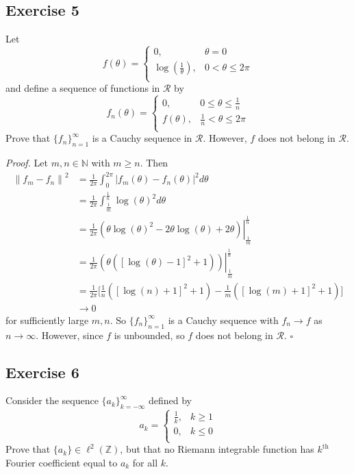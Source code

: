 \documentclass[12pt]{article}
\newenvironment{proof}{\textit{Proof.}}{\hfill$\square$}
\newcommand{\norm}[1]{\left\lVert#1\right\rVert}
\newcommand*\Eval[3]{\left.#1\right\rvert_{#2}^{#3}}
\newcommand{\bbn}{\mathbb{N}}
\newcommand{\bbz}{\mathbb{Z}}
\newcommand{\calr}{\mathcal{R}}
\begin{document}
\subsection*{Exercise 5}
Let
\begin{equation*}
    f(\theta)=\begin{cases}
        0, &\theta=0\\
        \log(\frac{1}{\theta}), &0<\theta\le2\pi\\
    \end{cases}
\end{equation*}
and define a sequence of functions in $\mathcal{R}$ by
\begin{equation*}
    f_n(\theta)=\begin{cases}
        0, &0\le\theta\le\frac{1}{n}\\
        f(\theta), &\frac{1}{n}<\theta\le2\pi\\
    \end{cases}
\end{equation*}
Prove that $\{f_n\}_{n=1}^\infty$ is a Cauchy sequence in $\calr$. However, $f$ does not belong in $\calr$.

\vspace{2em}
\begin{proof}
    Let $m,n\in\bbn$ with $m\ge n$. Then
    \begin{align*}
        \norm{f_m - f_n}^2 &= \frac{1}{2\pi}\int_{0}^{2\pi}|f_m(\theta)-f_n(\theta)|^2d\theta \\
        &= \frac{1}{2\pi}\int_{\frac{1}{m}}^{\frac{1}{n}}\log(\theta)^2d\theta \\
        &= \frac{1}{2\pi}\Eval{(\theta\log(\theta)^2 -2\theta\log(\theta)+2\theta)}{\frac{1}{m}}{\frac{1}{n}} \\
        &= \frac{1}{2\pi}\Eval{(\theta([\log(\theta) - 1]^2 + 1))}{\frac{1}{m}}{\frac{1}{n}} \\
        &= \frac{1}{2\pi}\Big[\frac{1}{n}([\log(n) + 1]^2 + 1) - \frac{1}{m}([\log(m) + 1]^2 + 1)\Big] \\
        &\to 0
    \end{align*}
    for sufficiently large $m,n$. So $\{f_n\}_{n=1}^\infty$ is a Cauchy sequence with $f_n\to f$ as $n\to\infty$. However, since $f$ is unbounded, so $f$ does not belong in $\calr$.
\end{proof}
\newpage
\subsection*{Exercise 6}
Consider the sequence $\{a_k\}_{k=-\infty}^\infty$ defined by 
\begin{equation*}
    a_k=\begin{cases}
        \frac{1}{k}, &k\ge1 \\
        0, &k\le0 \\
    \end{cases}
\end{equation*}
Prove that $\{a_k\}\in \ell^2(\bbz)$, but that no Riemann integrable function has $k^{\text{th}}$ Fourier coefficient
equal to $a_k$ for all $k$.
\end{document}
